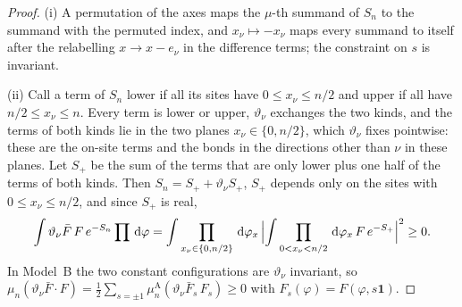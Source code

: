 \documentclass[11pt,a4paper]{amsart}
\theoremstyle{definition}
\theoremstyle{remark}
\numberwithin{equation}{section}
\newcommand{\dd}{\,\mathrm{d}}             %
\begin{document}
\begin{proof}
(i) A permutation of the axes maps the $\mu$-th summand of $S_n$ to the summand with the permuted index, and $x_\nu\mapsto-x_\nu$ maps every summand to itself after the relabelling $x\to x-e_\nu$ in the difference terms; the constraint on $s$ is invariant.

(ii) Call a term of $S_n$ lower if all its sites have $0\le x_\nu\le n/2$ and upper if all have $n/2\le x_\nu\le n$. Every term is lower or upper, $\vartheta_\nu$ exchanges the two kinds, and the terms of both kinds lie in the two planes $x_\nu\in\{0,n/2\}$, which $\vartheta_\nu$ fixes pointwise: these are the on-site terms and the bonds in the directions other than $\nu$ in these planes. Let $S_+$ be the sum of the terms that are only lower plus one half of the terms of both kinds. Then $S_n=S_++\vartheta_\nu S_+$, $S_+$ depends only on the sites with $0\le x_\nu\le n/2$, and since $S_+$ is real,
\[
\int\vartheta_\nu\bar F\,F\,e^{-S_n}\prod\dd\varphi=\int\prod_{x_\nu\in\{0,n/2\}}\dd\varphi_x\,\Bigl|\int\prod_{0<x_\nu<n/2}\dd\varphi_x\,F\,e^{-S_+}\Bigr|^2\ge0 .
\]
In Model~B the two constant configurations are $\vartheta_\nu$ invariant, so $\mu_n(\vartheta_\nu\bar F\cdot F)=\frac12\sum_{s=\pm1}\mu^{\mathrm A}_n(\vartheta_\nu\bar F_s\,F_s)\ge0$ with $F_s(\varphi)=F(\varphi,s\mathbf 1)$.


\end{proof}
\end{document}
